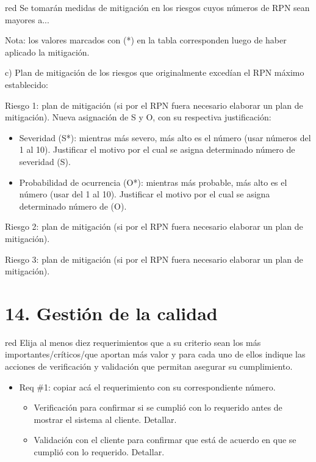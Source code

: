 \documentclass[
11pt, %
]{charter}
\begin{document}
{\begin{consigna}{red}
Se tomarán medidas de mitigación en los riesgos cuyos números de RPN sean mayores a...

Nota: los valores marcados con (*) en la tabla corresponden luego de haber aplicado la mitigación.

c) Plan de mitigación de los riesgos que originalmente excedían el RPN máximo establecido:
 
Riesgo 1: plan de mitigación (si por el RPN fuera necesario elaborar un plan de mitigación).
  Nueva asignación de S y O, con su respectiva justificación:
  \begin{itemize}
	\item Severidad (S*): mientras más severo, más alto es el número (usar números del 1 al 10).
          Justificar el motivo por el cual se asigna determinado número de severidad (S).
	\item Probabilidad de ocurrencia (O*): mientras más probable, más alto es el número (usar del 1 al 10).
          Justificar el motivo por el cual se asigna determinado número de (O).
	\end{itemize}

Riesgo 2: plan de mitigación (si por el RPN fuera necesario elaborar un plan de mitigación).
 
Riesgo 3: plan de mitigación (si por el RPN fuera necesario elaborar un plan de mitigación).

\end{consigna}


\section{14. Gestión de la calidad}
\label{sec:calidad}

\begin{consigna}{red}
Elija al menos diez requerimientos que a su criterio sean los más importantes/críticos/que aportan más valor y para cada uno de ellos indique las acciones de verificación y validación que permitan asegurar su cumplimiento.

\begin{itemize} 
\item Req \#1: copiar acá el requerimiento con su correspondiente número.

\begin{itemize}
	\item Verificación para confirmar si se cumplió con lo requerido antes de mostrar el sistema al cliente. Detallar.
	\item Validación con el cliente para confirmar que está de acuerdo en que se cumplió con lo requerido. Detallar. 
\end{itemize}


\end{itemize}
\end{consigna}}
\end{document}
